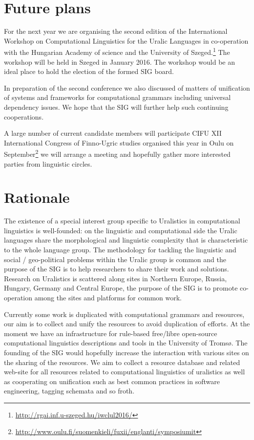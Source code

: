 \documentclass[11pt,a4paper]{article}
\begin{document}
\section*{Future plans}

For the next year we are organising the second edition of the 
International Workshop on Computational Linguistics for the Uralic
Languages  in co-operation with
the Hungarian Academy of science and the University of Szeged.\footnote{\url{http://rgai.inf.u-szeged.hu/iwclul2016/}} The workshop
will be held in Szeged in January 2016. The workshop would be an ideal place to hold the election of the formed SIG board.

In preparation of the second conference we also discussed of matters of unification of systems and frameworks for computational grammars including universal dependency issues. We hope that the SIG will further help such continuing cooperations.

A large number of current candidate members will participate CIFU XII International Congress of Finno-Ugric studies organised this year in Oulu on September\footnote{\url{http://www.oulu.fi/suomenkieli/fuxii/englanti/symposiumit}} we will arrange a meeting and hopefully gather more interested parties from linguistic circles. 

\section*{Rationale}

The existence of a special interest group specific to
Uralistics in computational linguistics is well-founded: on the
linguistic and computational side the Uralic languages share the
morphological and linguistic complexity that is characteristic to the whole
language group. The methodology for tackling the linguistic and
social / geo-political problems within the Uralic group is common and
the purpose of the SIG is to help researchers to share their work and
solutions. Research on Uralistics is scattered along sites in Northern
Europe, Russia, Hungary, Germany and Central Europe, the purpose of the
SIG is to promote co-operation among the sites and platforms for 
common work.

Currently some work is duplicated with computational grammars and resources,
our aim is to collect and unify the resources to avoid duplication of efforts.
At the moment we have an infrastructure for rule-based free/libre open-source computational linguistics descriptions and tools in the
University of Tromsø. The founding of the SIG would hopefully
increase the interaction with various sites on the sharing of the
resources. We aim to collect a resource database and related web-site for all resources related to computational linguistics of uralistics as well as cooperating on unification such as best common practices in software engineering, tagging schemata and so froth.
\end{document}
